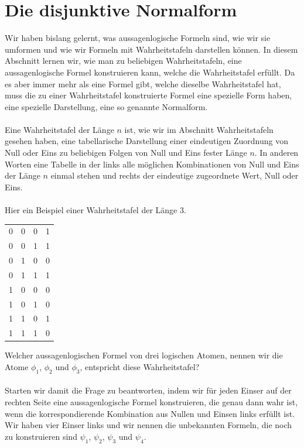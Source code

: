 \documentclass[11pt,a4paper,leqno]{report}
\numberwithin{equation}{chapter}
\begin{document}
\section{Die disjunktive Normalform}
Wir haben bislang gelernt, was aussagenlogische Formeln sind, wie wir sie umformen und wie wir Formeln mit Wahrheitstafeln darstellen k\"onnen. In diesem Abschnitt lernen wir, wie man zu beliebigen Wahrheitstafeln, eine aussagenlogische Formel konstruieren kann, welche die Wahrheitstafel erf\"ullt. Da es aber immer mehr als eine Formel gibt, welche dieselbe Wahrheitstafel hat, muss die zu einer Wahrheitstafel konstruierte Formel eine spezielle Form haben, eine spezielle Darstellung, eine so genannte Normalform.\\
\\
Eine Wahrheitstafel der L\"ange $n$ ist, wie wir im Abschnitt Wahrheitstafeln gesehen haben, eine tabellarische Darstellung einer eindeutigen Zuordnung von Null oder Eins zu beliebigen Folgen von Null und Eins fester L\"ange $n$. In anderen Worten eine Tabelle in der links alle m\"oglichen Kombinationen von Null und Eins der L\"ange $n$ einmal stehen und rechts der eindeutige zugeordnete Wert, Null oder Eins.\\
\\
Hier ein Beispiel einer Wahrheitstafel der L\"ange 3.
\begin{center}
	\begin{tabular}{|c c c|c|}
		\hline
		0 & 0 & 0 & 1\\
		0 & 0 & 1 & 1\\
		0 & 1 & 0 & 0\\
		0 & 1 & 1 & 1\\
		1 & 0 & 0 & 0\\
		1 & 0 & 1 & 0\\
		1 & 1 & 0 & 1\\
		1 & 1 & 1 & 0\\
		\hline
	\end{tabular}  
\end{center}
Welcher aussagenlogischen Formel von drei logischen Atomen, nennen wir die Atome $\phi_1$, $\phi_2$ und $\phi_3$, entspricht diese Wahrheitstafel?\\
\\
Starten wir damit die Frage zu beantworten, indem wir f\"ur jeden Einser auf der rechten Seite eine aussagenlogische Formel konstruieren, die genau dann wahr ist, wenn die korrespondierende Kombination aus Nullen und Einsen links erf\"ullt ist.
Wir haben vier Einser links und wir nennen die unbekannten Formeln, die noch zu konstruieren sind $\psi_1$, $\psi_2$, $\psi_3$ und $\psi_4$.\\
\end{document}
